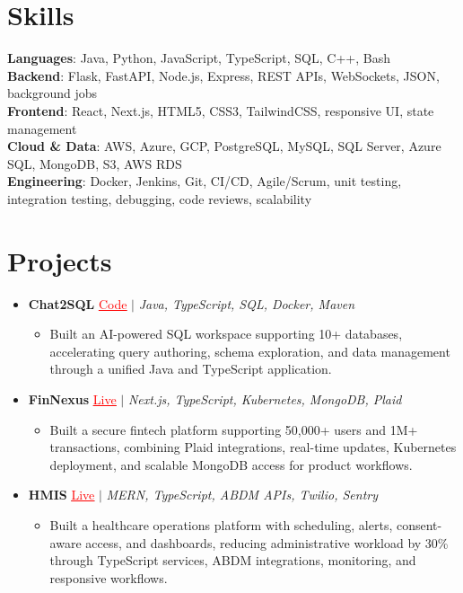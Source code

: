 \documentclass[letterpaper,10pt]{article}
\newcommand{\resumeItem}[1]{\item\small{{#1 \vspace{-2pt}}}}
\newcommand{\resumeProjectHeading}[1]{\item \small #1 \vspace{-2pt}}
\newcommand{\resumeSubHeadingListStart}{\begin{itemize}[leftmargin=0.0in, label={}]}
\newcommand{\resumeSubHeadingListEnd}{\end{itemize}}
\newcommand{\resumeProjItemListStart}{\begin{itemize}[leftmargin=0.15in,label=\textbullet,itemsep=0pt,topsep=0pt,parsep=0pt,partopsep=0pt]}
\newcommand{\resumeProjItemListEnd}{\end{itemize}\vspace{-4pt}}
\begin{document}
\section{Skills}
\begin{itemize}[leftmargin=0.15in, label={}]
\small{\item{
\textbf{Languages}: Java, Python, JavaScript, TypeScript, SQL, C++, Bash \\
\textbf{Backend}: Flask, FastAPI, Node.js, Express, REST APIs, WebSockets, JSON, background jobs \\
\textbf{Frontend}: React, Next.js, HTML5, CSS3, TailwindCSS, responsive UI, state management \\
\textbf{Cloud \& Data}: AWS, Azure, GCP, PostgreSQL, MySQL, SQL Server, Azure SQL, MongoDB, S3, AWS RDS \\
\textbf{Engineering}: Docker, Jenkins, Git, CI/CD, Agile/Scrum, unit testing, integration testing, debugging, code reviews, scalability
}}
\end{itemize}

\vspace{-8pt}
\section{Projects}
\resumeSubHeadingListStart
\vspace{1pt}

\resumeProjectHeading{\textbf{Chat2SQL} {\href{https://github.com/SAHAJ-BHADJA/Chat2SQL}{\textcolor{red}{\underline{Code}}}} $|$ \emph{Java, TypeScript, SQL, Docker, Maven}}
\resumeProjItemListStart
\resumeItem{Built an AI-powered SQL workspace supporting 10+ databases, accelerating query authoring, schema exploration, and data management through a unified Java and TypeScript application.}
\resumeProjItemListEnd

\vspace{2pt}
\resumeProjectHeading{\textbf{FinNexus} {\href{https://fin-nexus.vercel.app/}{\textcolor{red}{\underline{Live}}}} $|$ \emph{Next.js, TypeScript, Kubernetes, MongoDB, Plaid}}
\resumeProjItemListStart
\resumeItem{Built a secure fintech platform supporting 50,000+ users and 1M+ transactions, combining Plaid integrations, real-time updates, Kubernetes deployment, and scalable MongoDB access for product workflows.}
\resumeProjItemListEnd

\vspace{2pt}
\resumeProjectHeading{\textbf{HMIS} {\href{https://hims-rouge.vercel.app/}{\textcolor{red}{\underline{Live}}}} $|$ \emph{MERN, TypeScript, ABDM APIs, Twilio, Sentry}}
\resumeProjItemListStart
\resumeItem{Built a healthcare operations platform with scheduling, alerts, consent-aware access, and dashboards, reducing administrative workload by 30\% through TypeScript services, ABDM integrations, monitoring, and responsive workflows.}
\resumeProjItemListEnd

\resumeSubHeadingListEnd
\end{document}
